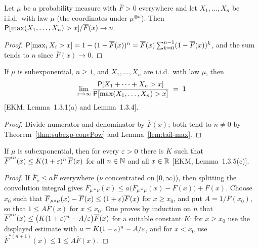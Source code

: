 \begin{lemma}
  \label{lem:tail-max}
  \leanok
  Let $\mu$ be a probability measure with $\overline{F} > 0$ everywhere and let
  $X_1, \ldots, X_n$ be i.i.d.\ with law $\mu$ (the coordinates under $\mu^{\otimes n}$). Then
  $\mathsf{P}[\max(X_1, \ldots, X_n) > x] / \overline{F}(x) \to n$.
\end{lemma}
\begin{proof}
  \leanok
  $\mathsf{P}[\max_i X_i > x] = 1 - (1 - \overline{F}(x))^n = \overline{F}(x) \sum_{k=0}^{n-1} (1 - \overline{F}(x))^k$,
  and the sum tends to $n$ since $\overline{F}(x) \to 0$.
\end{proof}

\begin{theorem}
  \label{thm:single-big-jump}
  \leanok
  If $\mu$ is subexponential, $n \ge 1$, and $X_1, \ldots, X_n$ are i.i.d.\ with law $\mu$, then
  \begin{align*}
    \lim_{x \to \infty} \frac{\mathsf{P}[X_1 + \cdots + X_n > x]}{\mathsf{P}[\max(X_1, \ldots, X_n) > x]} \; = \; 1
  \end{align*}
  [EKM, Lemma~1.3.1(a) and Lemma~1.3.4].
\end{theorem}
\begin{proof}
  \leanok
  Divide numerator and denominator by $\overline{F}(x)$; both tend to $n \ne 0$ by
  Theorem~\ref{thm:subexp-convPow} and Lemma~\ref{lem:tail-max}.
\end{proof}

\begin{theorem}
  \label{thm:kesten}
  \leanok
  If $\mu$ is subexponential, then for every $\varepsilon > 0$ there is $K$ such that
  $\overline{F}^{*n}(x) \le K (1 + \varepsilon)^n \, \overline{F}(x)$ for all $n \in \mathbb{N}$ and all
  $x \in \mathbb{R}$ [EKM, Lemma~1.3.5(c)].
\end{theorem}
\begin{proof}
  \leanok
  If $\overline{F}_\nu \le a \overline{F}$ everywhere ($\nu$ concentrated on $[0,\infty)$), then
  splitting the convolution integral gives
  $\overline{F}_{\mu*\nu}(x) \le a \big( \overline{F}_{\mu*\mu}(x) - \overline{F}(x) \big) + \overline{F}(x)$.
  Choose $x_0$ such that $\overline{F}_{\mu*\mu}(x) - \overline{F}(x) \le (1 + \varepsilon) \overline{F}(x)$
  for $x \ge x_0$, and put $A = 1/\overline{F}(x_0)$, so that $1 \le A \overline{F}(x)$ for $x \le x_0$.
  One proves by induction on $n$ that
  $\overline{F}^{*n}(x) \le \big( K (1 + \varepsilon)^n - A/\varepsilon \big) \overline{F}(x)$ for a suitable
  constant $K$: for $x \ge x_0$ use the displayed estimate with
  $a = K (1+\varepsilon)^n - A/\varepsilon$, and for $x < x_0$ use $\overline{F}^{*(n+1)}(x) \le 1 \le A \overline{F}(x)$.
\end{proof}

